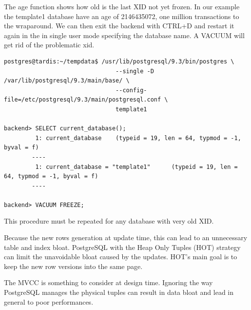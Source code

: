 The age function shows how old is the last XID not yet frozen. In our example the template1
database have an age of 2146435072, one million transactions to the wraparound. We can then exit 
the backend with CTRL+D and restart it again in the in single user mode specifying the database 
name. A VACUUM will get rid of the problematic xid.

\begin{verbatim}
postgres@tardis:~/tempdata$ /usr/lib/postgresql/9.3/bin/postgres \
                                --single -D /var/lib/postgresql/9.3/main/base/ \
                                --config-file=/etc/postgresql/9.3/main/postgresql.conf \
                                template1
                                
backend> SELECT current_database();
         1: current_database    (typeid = 19, len = 64, typmod = -1, byval = f)
        ----
         1: current_database = "template1"      (typeid = 19, len = 64, typmod = -1, byval = f)
        ----

backend> VACUUM FREEZE;
\end{verbatim}

This procedure must be repeated for any database with very old XID.\newline

Because the new rows generation at update time, this can lead to an unnecessary table and index bloat.
PostgreSQL with the Heap Only Tuples (HOT)\index{HOT strategy} strategy can limit the unavoidable bloat 
caused by the updates. HOT's main goal is to keep the new row versions into the same page. 

The MVCC is something to consider at design time. Ignoring the way PostgreSQL manages the physical tuples 
can result in data bloat and lead in general to poor performances.
